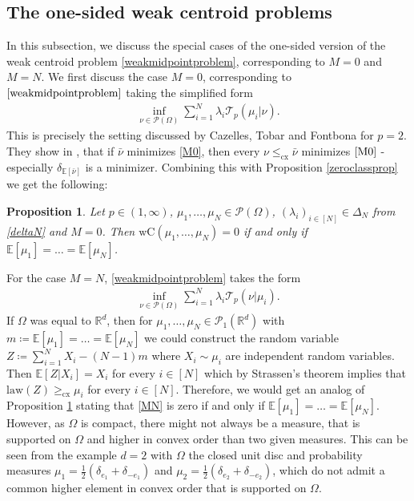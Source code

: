 \documentclass[10pt,a4paper]{amsart}
\newcommand{\RR}{\mathbb{R}}
\newcommand{\EE}{\mathbb{E}}
\newtheorem{prop}[thm]{Proposition}
\begin{document}
\subsection{The one-sided weak centroid problems}
In this subsection, we discuss the special cases of the one-sided version of the weak centroid problem \eqref{weakmidpointproblem}, corresponding to $M=0$ and $M=N$.
We first discuss the case $M=0$, corresponding to $\eqref{weakmidpointproblem}$ taking the simplified form
\begin{gather}\label{M0}
	\inf_{\nu\in\mathcal P(\Omega)}\sum_{i=1}^N \lambda_i \mathcal T_p(\mu_i|\nu).
\end{gather}
This is precisely the setting discussed by Cazelles, Tobar and Fontbona \cite{cazelles2021} for $p=2$. They show in \cite[Lma 1]{cazelles2021}, that if $\bar\nu$ minimizes \eqref{M0}, then every $\nu\leq_{\text{cx}}\bar\nu$ minimizes $\eqref{M0}$ - especially $\delta_{\EE[\bar\nu]}$ is a minimizer. Combining this with Proposition \ref{zeroclassprop} we get the following:
\begin{prop}\label{M0zeroclassprop}
	Let $p\in(1,\infty)$, $\mu_1,\dots,\mu_N\in\mathcal P(\Omega)$, $(\lambda_i)_{i\in[N]}\in\Delta_N$ from \eqref{deltaN} and $M=0$. Then $\text{wC}(\mu_1,\dots,\mu_N)=0$ if and only if $\EE[\mu_1]=\dots=\EE[\mu_N]$.
\end{prop}
For the case $M=N$, \eqref{weakmidpointproblem} takes the form
\begin{gather}\label{MN}
	\inf_{\nu\in\mathcal P(\Omega)}\sum_{i=1}^N\lambda_i\mathcal T_p(\nu|\mu_i).
\end{gather}
If $\Omega$ was equal to $\RR^d$, then for $\mu_1,\dots,\mu_N\in\mathcal P_1(\RR^d)$ with $m\coloneqq\EE[\mu_1]=\dots=\EE[\mu_N]$ we could construct the random variable $Z\coloneqq\sum_{i=1}^NX_i-(N-1)m$ where $X_i\sim\mu_i$ are independent random variables. Then $\EE[Z|X_i]=X_i$ for every $i\in[N]$ which by Strassen's theorem implies that $\text{law}(Z)\geq_{\text{cx}}\mu_i$ for every $i\in[N]$. Therefore, we would get an analog of Proposition \ref{M0zeroclassprop} stating that \eqref{MN} is zero if and only if $\EE[\mu_1]=\dots=\EE[\mu_N]$.\\
However, as $\Omega$ is compact, there might not always be a measure, that is supported on $\Omega$ and higher in convex order than two given measures. This can be seen from the example $d=2$ with $\Omega$ the closed unit disc and probability measures $\mu_1=\frac{1}{2}(\delta_{e_1}+\delta_{-e_1})$ and $\mu_2=\frac{1}{2}(\delta_{e_2}+\delta_{-e_2})$, which do not admit a common higher element in convex order that is supported on $\Omega$.
\end{document}
